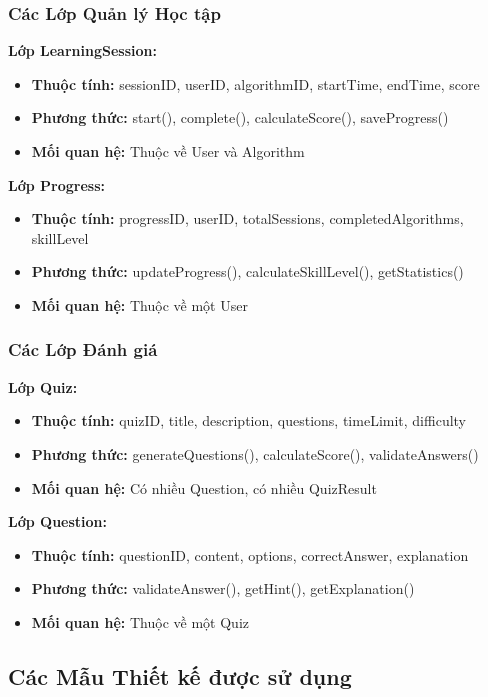 \subsubsection{Các Lớp Quản lý Học tập}

\textbf{Lớp LearningSession:}
\begin{itemize}
    \item \textbf{Thuộc tính:} sessionID, userID, algorithmID, startTime, endTime, score
    \item \textbf{Phương thức:} start(), complete(), calculateScore(), saveProgress()
    \item \textbf{Mối quan hệ:} Thuộc về User và Algorithm
\end{itemize}

\textbf{Lớp Progress:}
\begin{itemize}
    \item \textbf{Thuộc tính:} progressID, userID, totalSessions, completedAlgorithms, skillLevel
    \item \textbf{Phương thức:} updateProgress(), calculateSkillLevel(), getStatistics()
    \item \textbf{Mối quan hệ:} Thuộc về một User
\end{itemize}

\subsubsection{Các Lớp Đánh giá}

\textbf{Lớp Quiz:}
\begin{itemize}
    \item \textbf{Thuộc tính:} quizID, title, description, questions, timeLimit, difficulty
    \item \textbf{Phương thức:} generateQuestions(), calculateScore(), validateAnswers()
    \item \textbf{Mối quan hệ:} Có nhiều Question, có nhiều QuizResult
\end{itemize}

\textbf{Lớp Question:}
\begin{itemize}
    \item \textbf{Thuộc tính:} questionID, content, options, correctAnswer, explanation
    \item \textbf{Phương thức:} validateAnswer(), getHint(), getExplanation()
    \item \textbf{Mối quan hệ:} Thuộc về một Quiz
\end{itemize}

\subsection{Các Mẫu Thiết kế được sử dụng}

